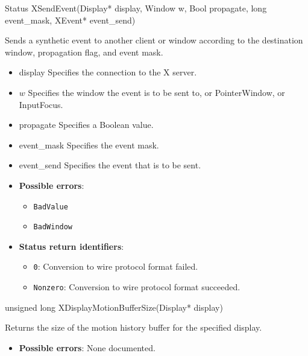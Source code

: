 \documentclass{report}
\begin{document}
\begin{itemize}
        \begin{cppcode}
            Status XSendEvent(Display* display, Window w, Bool propagate, long event_mask, XEvent* event_send)
        \end{cppcode}
        \bigbreak \noindent
        Sends a synthetic event to another client or window according to the destination window, propagation flag, and event mask.
        \begin{itemize}
            \item display Specifies the connection to the X server.
            \item $w$ Specifies the window the event is to be sent to, or PointerWindow, or InputFocus.
            \item propagate Specifies a Boolean value.
            \item event\_mask Specifies the event mask.
            \item event\_send Specifies the event that is to be sent.
        \end{itemize}
        \begin{itemize}
            \item \textbf{Possible errors}:
                \begin{itemize}
                    \item \texttt{BadValue}
                    \item \texttt{BadWindow}
                \end{itemize}
            \item \textbf{Status return identifiers}:
                \begin{itemize}
                    \item \texttt{0}: Conversion to wire protocol format failed.
                    \item \texttt{Nonzero}: Conversion to wire protocol format succeeded.
                \end{itemize}
        \end{itemize}

        \begin{cppcode}
            unsigned long XDisplayMotionBufferSize(Display* display)
        \end{cppcode}
        \bigbreak \noindent
        Returns the size of the motion history buffer for the specified display.

        \begin{itemize}
            \item \textbf{Possible errors}: None documented.
        \end{itemize}


\end{itemize}
\end{document}
